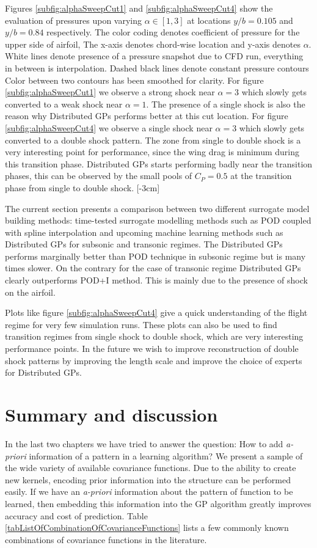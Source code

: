 Figures \ref{subfig:alphaSweepCut1} and \ref{subfig:alphaSweepCut4} show the evaluation of pressures upon varying $\alpha \in [1, 3]$ at locations $y/b = 0.105$ and $y/b = 0.84$ respectively. The color coding denotes coefficient of pressure for the upper side of airfoil, The x-axis denotes chord-wise location and y-axis denotes $\alpha$. White lines denote presence of a pressure snapshot due to CFD run, everything in between is interpolation. Dashed black lines denote constant pressure contours Color between two contours has been smoothed for clarity. For figure \ref{subfig:alphaSweepCut1} we observe a strong shock near $\alpha = 3$ which slowly gets converted to a weak shock near $\alpha = 1$. The presence of a single shock is also the reason why Distributed GPs performs better at this cut location. For figure \ref{subfig:alphaSweepCut4} we observe a single shock near $\alpha = 3$ which slowly gets converted to a double shock pattern. The zone from single to double shock is a very interesting point for performance, since the wing drag is minimum during this transition phase. Distributed GPs starts performing badly near the transition phases, this can be observed by the small pools of $C_{P} = 0.5$ at the transition phase from single to double shock. 
[-3cm]

The current section presents a comparison between two different surrogate model building methods: time-tested surrogate modelling methods such as POD coupled with spline interpolation and upcoming machine learning methods such as Distributed GPs for subsonic and transonic regimes. The Distributed GPs performs marginally better than POD technique in subsonic regime but is many times slower. On the contrary for the case of transonic regime Distributed GPs clearly outperforms POD+I method. This is mainly due to the presence of shock on the airfoil. 

Plots like figure \ref{subfig:alphaSweepCut4} give a quick understanding of the flight regime for very few simulation runs. These plots can also be used to find transition regimes from single shock to double shock, which are very interesting performance points. In the future we wish to improve reconstruction of double shock patterns by improving the length scale and improve the choice of experts for Distributed GPs.

\section{Summary and discussion}\label{subsec:ExpressingStructureKernelConclusion}
In the last two chapters we have tried to answer the question: How to add \textit{a-priori} information of a pattern in a learning algorithm? We present a sample of the wide variety of available covariance functions. Due to the ability to create new kernels, encoding prior information into the structure can be performed easily. If we have an \textit{a-priori} information about the pattern of function to be learned, then embedding this information into the GP algorithm greatly improves accuracy and cost of prediction. Table \ref{tabListOfCombinationOfCovarianceFunctions} lists a few commonly known combinations of covariance functions in the literature. 

